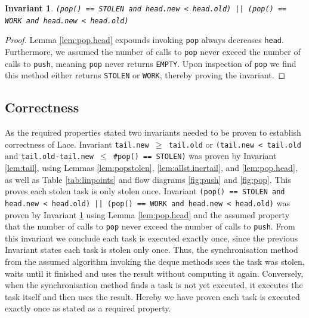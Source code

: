 \documentclass{sig-alternate-br}
\newtheorem{invariant}{Invariant}
\begin{document}
\begin{invariant}
	\texttt{(pop() == STOLEN and head.new < head.old) || (pop() == WORK and head.new < head.old)}
	\label{inv:exec}
\end{invariant}
\begin{proof}
	Lemma \ref{lem:pop.head} expounds invoking \texttt{pop} always decreases \texttt{head}.
	Furthermore, we assumed the number of calls to \texttt{pop} never exceed the number of calls to \texttt{push}, meaning \texttt{pop} never returns \texttt{EMPTY}.
	Upon inspection of \texttt{pop} we find this method either returns \texttt{STOLEN} or \texttt{WORK}, thereby proving the invariant.
\end{proof}

\subsection{Correctness}
As the required properties stated two invariants needed to be proven to establish correctness of Lace.
Invariant \texttt{tail.new $\geq$ tail.old} or \texttt{(tail.new < tail.old} and \texttt{tail.old-tail.new $\leq$ \#pop() == STOLEN)} was proven by Invariant \ref{lem:tail}, using Lemmas \ref{lem:popstolen}, \ref{lem:allst.incrtail}, and \ref{lem:pop.head}, as well as Table \ref{tab:linpoints} and flow diagrams \ref{fig:push} and \ref{fig:pop}.
This proves each stolen task is only stolen once.
Invariant \texttt{(pop() == STOLEN and head.new < head.old) || (pop() == WORK and head.new < head.old)} was proven by Invariant \ref{inv:exec} using Lemma \ref{lem:pop.head} and the assumed property that the number of calls to \texttt{pop} never exceed the number of calls to \texttt{push}.
From this invariant we conclude each task is executed exactly once, since the previous Invariant states each task is stolen only once.
Thus, the synchronisation method from the assumed algorithm invoking the deque methods sees the task was stolen, waits until it finished and uses the result without computing it again.
Conversely, when the synchronisation method finds a task is not yet executed, it executes the task itself and then uses the result.
Hereby we have proven each task is executed exactly once as stated as a required property.
\end{document}
